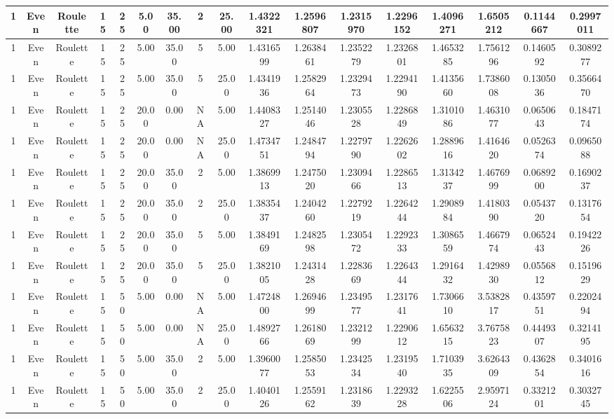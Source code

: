 \documentclass[a4paper]{article}
\begin{document}
\begin{center}
\begin{tabular}{ | c | c | c | c | c | c | c | c | c | c | c | c | c | c | c | c | c | }
		\hline
		1	&	Even	&	Roulette	&	15	&	25	&	5.00	&	35.00	&	2	&	25.00	&	1.4322321	&	1.2596807	&	1.2315970	&	1.2296152	&	1.4096271	&	1.6505212	&	0.1144667	&	0.2997011 \\
		\hline
		1	&	Even	&	Roulette	&	15	&	25	&	5.00	&	35.00	&	5	&	5.00	&	1.4316599	&	1.2638461	&	1.2352279	&	1.2326801	&	1.4653285	&	1.7561296	&	0.1460592	&	0.3089277 \\
		\hline
		1	&	Even	&	Roulette	&	15	&	25	&	5.00	&	35.00	&	5	&	25.00	&	1.4341936	&	1.2582964	&	1.2329473	&	1.2294190	&	1.4135660	&	1.7386008	&	0.1305036	&	0.3566470 \\
		\hline
		1	&	Even	&	Roulette	&	15	&	25	&	20.00	&	0.00	&	NA	&	5.00	&	1.4408327	&	1.2514046	&	1.2305528	&	1.2286849	&	1.3101086	&	1.4631077	&	0.0650643	&	0.1847174 \\
		\hline
		1	&	Even	&	Roulette	&	15	&	25	&	20.00	&	0.00	&	NA	&	25.00	&	1.4734751	&	1.2484794	&	1.2279790	&	1.2262602	&	1.2889616	&	1.4164620	&	0.0526374	&	0.0965088 \\
		\hline
		1	&	Even	&	Roulette	&	15	&	25	&	20.00	&	35.00	&	2	&	5.00	&	1.3869913	&	1.2475020	&	1.2309466	&	1.2286513	&	1.3134237	&	1.4676999	&	0.0689200	&	0.1690237 \\
		\hline
		1	&	Even	&	Roulette	&	15	&	25	&	20.00	&	35.00	&	2	&	25.00	&	1.3835437	&	1.2404260	&	1.2279219	&	1.2264244	&	1.2908984	&	1.4180390	&	0.0543720	&	0.1317654 \\
		\hline
		1	&	Even	&	Roulette	&	15	&	25	&	20.00	&	35.00	&	5	&	5.00	&	1.3849169	&	1.2482598	&	1.2305472	&	1.2292333	&	1.3086559	&	1.4667974	&	0.0652443	&	0.1942226 \\
		\hline
		1	&	Even	&	Roulette	&	15	&	25	&	20.00	&	35.00	&	5	&	25.00	&	1.3821005	&	1.2431428	&	1.2283669	&	1.2264344	&	1.2916432	&	1.4298930	&	0.0556812	&	0.1519629 \\
		\hline
		1	&	Even	&	Roulette	&	15	&	50	&	5.00	&	0.00	&	NA	&	5.00	&	1.4724800	&	1.2694699	&	1.2349577	&	1.2317641	&	1.7306610	&	3.5382817	&	0.4359751	&	0.2202494 \\
		\hline
		1	&	Even	&	Roulette	&	15	&	50	&	5.00	&	0.00	&	NA	&	25.00	&	1.4892766	&	1.2618069	&	1.2321299	&	1.2290612	&	1.6563215	&	3.7675823	&	0.4449307	&	0.3214195 \\
		\hline
		1	&	Even	&	Roulette	&	15	&	50	&	5.00	&	35.00	&	2	&	5.00	&	1.3960077	&	1.2585053	&	1.2342534	&	1.2319540	&	1.7103935	&	3.6264309	&	0.4362854	&	0.3401616 \\
		\hline
		1	&	Even	&	Roulette	&	15	&	50	&	5.00	&	35.00	&	2	&	25.00	&	1.4040126	&	1.2559162	&	1.2318639	&	1.2293228	&	1.6225506	&	2.9597124	&	0.3321201	&	0.3032745 \\

\end{tabular}
\end{center}
\end{document}
